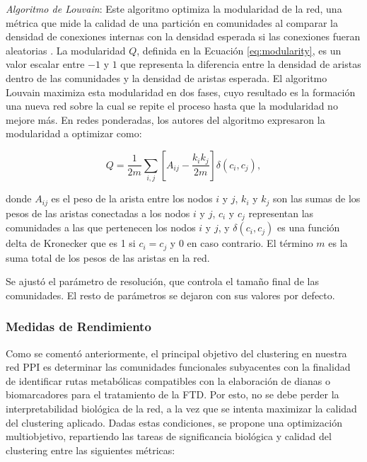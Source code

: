 \textit{Algoritmo de Louvain}: Este algoritmo optimiza la modularidad de la red, una métrica que mide la calidad de una partición en comunidades al comparar la densidad de conexiones internas con la densidad esperada si las conexiones fueran aleatorias \cite{Blondel2008Louvain}. La modularidad \( Q \), definida en la Ecuación \ref{eq:modularity}, es un valor escalar entre \(-1\) y \(1\) que representa la diferencia entre la densidad de aristas dentro de las comunidades y la densidad de aristas esperada. El algoritmo Louvain maximiza esta modularidad en dos fases, cuyo resultado es la formación una nueva red sobre la cual se repite el proceso hasta que la modularidad no mejore más. En redes ponderadas, los autores del algoritmo expresaron la modularidad a optimizar como:

\begin{equation}
	\label{eq:modularity}
	Q = \frac{1}{2m} \sum_{i,j} \left[ A_{ij} - \frac{k_i k_j}{2m} \right] \delta(c_i, c_j),
\end{equation}

\noindent donde \( A_{ij} \) es el peso de la arista entre los nodos \( i \) y \( j \), \( k_i \) y \( k_j \) son las sumas de los pesos de las aristas conectadas a los nodos \( i \) y \( j \), \( c_i \) y \( c_j \) representan las comunidades a las que pertenecen los nodos \( i \) y \( j \), y \( \delta(c_i, c_j) \) es una función delta de Kronecker que es 1 si \( c_i = c_j \) y 0 en caso contrario. El término \( m \) es la suma total de los pesos de las aristas en la red.

\noindent Se ajustó el parámetro de resolución, que controla el tamaño final de las comunidades. El resto de parámetros se dejaron con sus valores por defecto.

\subsubsection*{Medidas de Rendimiento}

Como se comentó anteriormente, el principal objetivo del clustering en nuestra red PPI es determinar las comunidades funcionales subyacentes con la finalidad de identificar rutas metabólicas compatibles con la elaboración de dianas o biomarcadores para el tratamiento de la FTD. Por esto, no se debe perder la interpretabilidad biológica de la red, a la vez que se intenta maximizar la calidad del clustering aplicado. Dadas estas condiciones, se propone una optimización multiobjetivo, repartiendo las tareas de significancia biológica y calidad del clustering entre las siguientes métricas:

